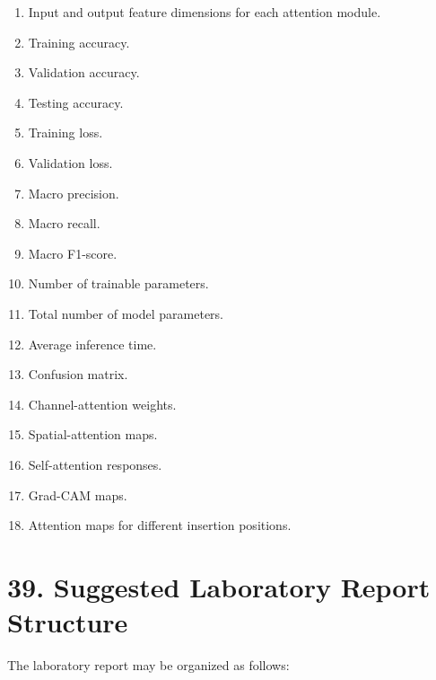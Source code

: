 \documentclass[10pt]{article}
\begin{document}
\begin{enumerate}

\item Input and output feature dimensions for each attention module.

\item Training accuracy.

\item Validation accuracy.

\item Testing accuracy.

\item Training loss.

\item Validation loss.

\item Macro precision.

\item Macro recall.

\item Macro F1-score.

\item Number of trainable parameters.

\item Total number of model parameters.

\item Average inference time.

\item Confusion matrix.

\item Channel-attention weights.

\item Spatial-attention maps.

\item Self-attention responses.

\item Grad-CAM maps.

\item Attention maps for different insertion positions.

\end{enumerate}

\section*{39. Suggested Laboratory Report Structure}

The laboratory report may be organized as follows:
\end{document}
